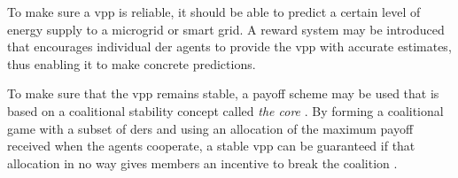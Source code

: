 To make sure a \ac{vpp} is reliable, it should be able to predict a certain level of energy supply to a microgrid or smart grid. A reward system may be introduced that encourages individual \ac{der} agents to provide the \ac{vpp} with accurate estimates, thus enabling it to make concrete predictions.

To make sure that the \ac{vpp} remains stable, a payoff scheme may be used that is based on a coalitional stability concept called \emph{the core} \cite{Myerson1991}. By forming a coalitional game with a subset of \acp{der} and using an allocation of the maximum payoff received when the agents cooperate, a stable \ac{vpp} can be guaranteed if that allocation in no way gives members an incentive to break the coalition \cite{ChalkiadakisRobuKotaEtAl2011, YeungPoonWu1999, SaadHanPoor2011}.
